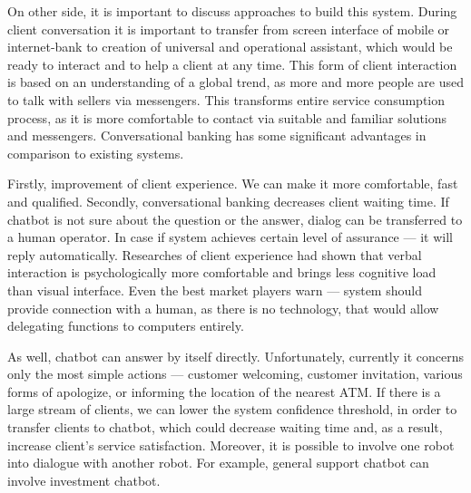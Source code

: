 On other side, it is important to discuss approaches to build this system.
During client conversation it is important to transfer from screen interface of mobile or internet-bank to creation of universal and operational assistant, which would be ready to interact and to help a client at any time.
This form of client interaction is based on an understanding of a global trend, as more and more people are used to talk with sellers via messengers. 
This transforms entire service consumption process, as it is more comfortable to contact via suitable and familiar solutions and messengers.
Conversational banking has some significant advantages in comparison to existing systems.

Firstly, improvement of client experience. 
We can make it more comfortable, fast and qualified.
Secondly, conversational banking decreases client waiting time. If chatbot is not sure about the question or the answer, dialog can be transferred to a human operator.
In case if system achieves certain level of assurance — it will reply automatically.
Researches of client experience had shown that verbal interaction is psychologically more comfortable and brings less cognitive load than visual interface.
Even the best market players warn — system should provide connection with a human, as there is no technology, that would allow delegating functions to computers entirely.
\cite{ways_ai_transforming_bi}

As well, chatbot can answer by itself directly.
Unfortunately, currently it concerns only the most simple actions — customer welcoming, customer invitation, various forms of apologize, or informing the location of the nearest ATM.
If there is a large stream of clients, we can lower the system confidence threshold, in order to transfer clients to chatbot, which could decrease waiting time and, as a result, increase client's service satisfaction.
Moreover, it is possible to involve one robot into dialogue with another robot.
For example, general support chatbot can involve investment chatbot.
\cite{accenture_chatbots}

